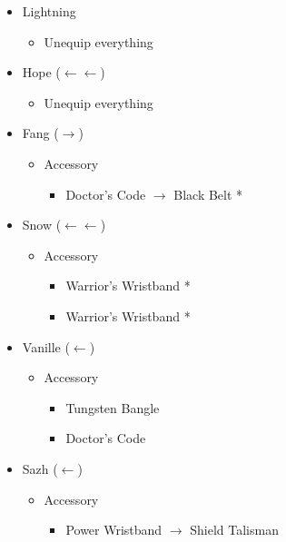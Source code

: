 \begin{paracol}{2}
\begin{menu}
\begin{itemize}
			\equip
			\begin{itemize}
				\item Lightning
				      \begin{itemize}
					      \item Unequip everything
				      \end{itemize}
				\item Hope ($\leftarrow\leftarrow$)
				      \begin{itemize}
					      \item Unequip everything
				      \end{itemize}
				\item Fang ($\rightarrow$)
				      \begin{itemize}
					      \item Accessory
					            \begin{itemize}
						            \item Doctor's Code $\rightarrow$ Black Belt *
					            \end{itemize}
				      \end{itemize}
				\item Snow ($\leftarrow\leftarrow$)
				      \begin{itemize}
					      \item Accessory
					            \begin{itemize}
						            \item Warrior's Wristband *
						            \item Warrior's Wristband *
					            \end{itemize}
				      \end{itemize}
				\item Vanille ($\leftarrow$)
				      \begin{itemize}
					      \item Accessory
					            \begin{itemize}
						            \item Tungsten Bangle
						            \item Doctor's Code
					            \end{itemize}
				      \end{itemize}
				\item Sazh ($\leftarrow$)
				      \begin{itemize}
					      \item Accessory
					            \begin{itemize}
						            \item Power Wristband $\rightarrow$ Shield Talisman

\end{itemize}
\end{itemize}
\end{itemize}
\end{itemize}
\end{menu}
\end{paracol}
